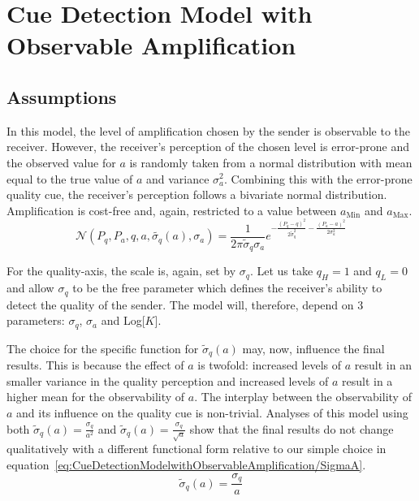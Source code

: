 \documentclass[a4paper,12pt]{article}
\numberwithin{equation}{section}
\begin{document}
\newpage\clearpage


\section{Cue Detection Model with Observable Amplification}
\label{sec:Cue Detection Model with Observable Amplification}
\subsection{Assumptions}
\label{sec:CueDetectionModelwithObservableAmplification/Assumptions}

In this model, the level of amplification chosen by the sender is observable to the receiver. However, the receiver's perception of the chosen level is error-prone and the observed value for $a$ is randomly taken from a normal distribution with mean equal to the true value of $a$ and variance $\sigma^{2}_{a}$. Combining this with the error-prone quality cue, the receiver's perception follows a bivariate normal distribution. Amplification is cost-free and, again, restricted to a value between $a_{\text{Min}}$ and $a_{\text{Max}}$. 
\begin{equation}
\label{eq:CueDetectionModelwithObservableAmplification/Normal}
\mathcal{N}(P_{q}, P_{a}, q, a, \tilde{\sigma_{q}}(a), \sigma_{a}) = \frac{1}{2 \pi \tilde{\sigma}_{q} \sigma_{a}} e^{-\frac{(P_{q}-q)^2}{2 \tilde{\sigma}_{q}^2}-\frac{(P_{a}-a)^2}{2 \sigma_{a}^2}}
\end{equation}

For the quality-axis, the scale is, again, set by $\sigma_{q}$. Let us take $q_{H}=1$ and $q_{L}=0$ and allow $\sigma_{q}$ to be the free parameter which defines the receiver's ability to detect the quality of the sender. The model will, therefore, depend on 3 parameters: $\sigma_{q}$, $\sigma_{a}$ and Log[$K$].

The choice for the specific function for $\tilde{\sigma}_{q}(a)$ may, now, influence the final results. This is because the effect of $a$ is twofold: increased levels of $a$ result in an smaller variance in the quality perception and increased levels of $a$ result in a higher mean for the observability of $a$. The interplay between the observability of $a$ and its influence on the quality cue is non-trivial. Analyses of this model using both $\tilde{\sigma}_{q}(a)=\frac{\sigma_{q}}{a^2}$ and $\tilde{\sigma}_{q}(a)=\frac{\sigma_{q}}{\sqrt{a}}$ show that the final results do not change qualitatively with a different functional form relative to our simple choice in equation~\ref{eq:CueDetectionModelwithObservableAmplification/SigmaA}.
\begin{equation}
\label{eq:CueDetectionModelwithObservableAmplification/SigmaA}
\tilde{\sigma}_{q}(a)=\frac{\sigma_{q}}{a}
\end{equation}
\end{document}
